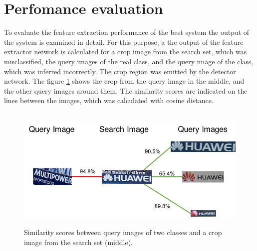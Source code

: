 \section{Perfomance evaluation}
To evaluate the feature extraction performance of the best system the output of the system is examined in detail. For this purpose, a the output of the feature extractor network is calculated for a crop image from the search set, which was misclassified, the query images of the real class, and the query image of the class, which was inferred incorrectly. The crop region was emitted by the detector network. The figure \ref{f:misclass} shows the crop from the query image in the middle, and the other query images around them. The similarity scores are indicated on the lines between the images, which was calculated with cosine distance.
\begin{figure}
  \centering
  \includegraphics[height=60mm]{images/mt/misclass.jpg}
  \caption{Similarity scores between query images of two classes and a crop image from the search set (middle).}
  \label{f:misclass}
\end{figure}

